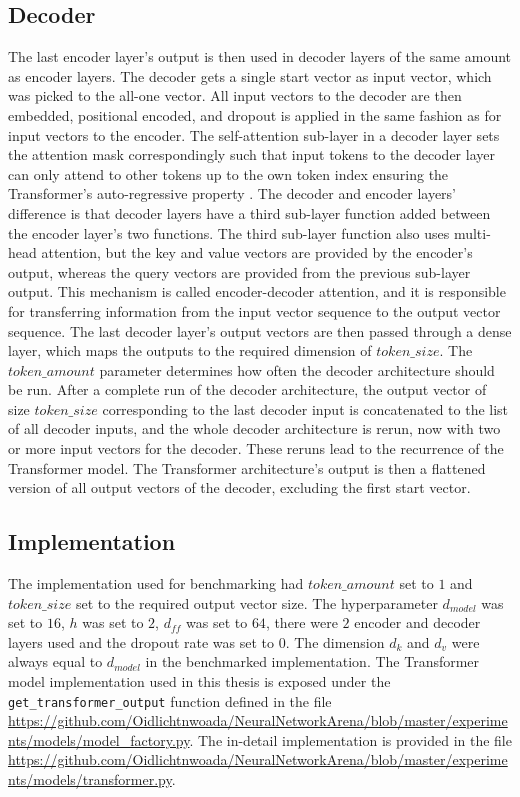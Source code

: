 \documentclass[draft,final]{vutinfth} %
\begin{document}
\subsection{Decoder} \label{decoder}
The last encoder layer's output is then used in decoder layers of the same amount as encoder layers.
The decoder gets a single start vector as input vector, which was picked to the all-one vector.
All input vectors to the decoder are then embedded, positional encoded, and dropout is applied in the same fashion as for input vectors to the encoder.
The self-attention sub-layer in a decoder layer sets the attention mask correspondingly such that input tokens to the decoder layer can only attend to other tokens up to the own token index ensuring the Transformer's auto-regressive property \cite[p. 5]{Transformer}.
The decoder and encoder layers' difference is that decoder layers have a third sub-layer function added between the encoder layer's two functions.
The third sub-layer function also uses multi-head attention, but the key and value vectors are provided by the encoder's output, whereas the query vectors are provided from the previous sub-layer output.
This mechanism is called encoder-decoder attention, and it is responsible for transferring information from the input vector sequence to the output vector sequence.
The last decoder layer's output vectors are then passed through a dense layer, which maps the outputs to the required dimension of $token\_size$.
The $token\_amount$ parameter determines how often the decoder architecture should be run.
After a complete run of the decoder architecture, the output vector of size $token\_size$ corresponding to the last decoder input is concatenated to the list of all decoder inputs, and the whole decoder architecture is rerun, now with two or more input vectors for the decoder.
These reruns lead to the recurrence of the Transformer model.
The Transformer architecture's output is then a flattened version of all output vectors of the decoder, excluding the first start vector.

\subsection{Implementation}
The implementation used for benchmarking had $token\_amount$ set to $1$ and $token\_size$ set to the required output vector size.
The hyperparameter $d_{model}$ was set to $16$, $h$ was set to $2$, $d_{ff}$ was set to $64$, there were $2$ encoder and decoder layers used and the dropout rate was set to $0$.
The dimension $d_k$ and $d_v$ were always equal to $d_{model}$ in the benchmarked implementation.
The Transformer model implementation used in this thesis is exposed under the \texttt{get\_transformer\_output} function defined in the file \url{https://github.com/Oidlichtnwoada/NeuralNetworkArena/blob/master/experiments/models/model_factory.py}.
The in-detail implementation is provided in the file \url{https://github.com/Oidlichtnwoada/NeuralNetworkArena/blob/master/experiments/models/transformer.py}.
\end{document}
